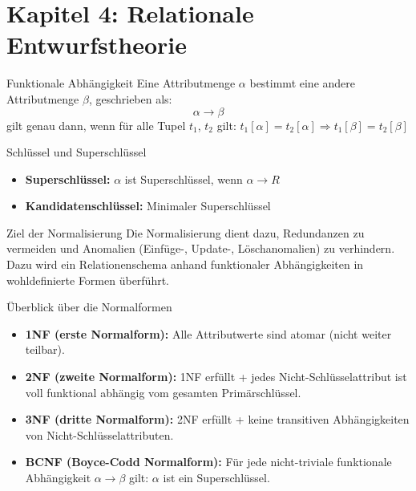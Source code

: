 \documentclass{article}
\begin{document}
\section{Kapitel 4: Relationale Entwurfstheorie}

\begin{block}{Funktionale Abhängigkeit}
Eine Attributmenge $\alpha$ bestimmt eine andere Attributmenge $\beta$, geschrieben als:
\[
\alpha \rightarrow \beta
\]
gilt genau dann, wenn für alle Tupel $t_1$, $t_2$ gilt: $t_1[\alpha] = t_2[\alpha] \Rightarrow t_1[\beta] = t_2[\beta]$
\end{block}

\begin{block}{Schlüssel und Superschlüssel}
\begin{itemize}
  \item \textbf{Superschlüssel:} $\alpha$ ist Superschlüssel, wenn $\alpha \rightarrow R$
  \item \textbf{Kandidatenschlüssel:} Minimaler Superschlüssel
\end{itemize}
\end{block}

\begin{block}{Ziel der Normalisierung}
Die Normalisierung dient dazu, Redundanzen zu vermeiden und Anomalien (Einfüge-, Update-, Löschanomalien) zu verhindern. Dazu wird ein Relationenschema anhand funktionaler Abhängigkeiten in wohldefinierte Formen überführt.
\end{block}

\begin{block}{Überblick über die Normalformen}
\begin{itemize}
  \item \textbf{1NF (erste Normalform):} 
    Alle Attributwerte sind atomar (nicht weiter teilbar).
  \item \textbf{2NF (zweite Normalform):} 
    1NF erfüllt + jedes Nicht-Schlüsselattribut ist voll funktional abhängig vom gesamten Primärschlüssel.
  \item \textbf{3NF (dritte Normalform):} 
    2NF erfüllt + keine transitiven Abhängigkeiten von Nicht-Schlüsselattributen.
  \item \textbf{BCNF (Boyce-Codd Normalform):} 
    Für jede nicht-triviale funktionale Abhängigkeit $\alpha \rightarrow \beta$ gilt: $\alpha$ ist ein Superschlüssel.
\end{itemize}
\end{block}
\end{document}
